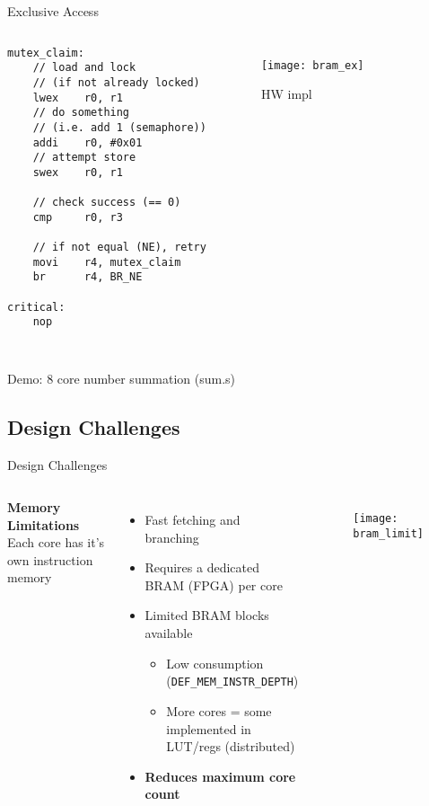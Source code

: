 \documentclass[aspectratio=169]{beamer}
\newcommand\pro{\item[$+$]}
\newcommand\con{\item[$-$]}
\begin{document}
\begin{frame}[fragile]{Exclusive Access}

\begin{columns}[t]
\begin{lstlisting}[basicstyle=\tiny\ttfamily]
mutex_claim:
    // load and lock
    // (if not already locked)
    lwex    r0, r1
    // do something
    // (i.e. add 1 (semaphore))
    addi    r0, #0x01
    // attempt store
    swex    r0, r1
    
    // check success (== 0)
    cmp     r0, r3
    
    // if not equal (NE), retry
    movi    r4, mutex_claim
    br      r4, BR_NE
    
critical:
    nop
    
\end{lstlisting}

\vspace{-1cm}
\begin{figure}
    \centering
    \texttt{[image: bram\_ex]}
    \caption{HW impl}
    \label{}
\end{figure}
\end{columns}
Demo: 8 core number summation (sum.s)
\end{frame}

\subsection{Design Challenges}
\begin{frame}[fragile,t]{Design Challenges}
\begin{columns}[t]
\textbf{Memory Limitations}\\
\vspace{0.5cm}
Each core has it's own instruction memory
\begin{itemize}
    \pro Fast fetching and branching
    \con Requires a dedicated BRAM (FPGA) per core
    \con Limited BRAM blocks available
    \begin{itemize}
        \con Low consumption (\verb|DEF_MEM_INSTR_DEPTH|)
        \con More cores = some implemented in LUT/regs (distributed)
    \end{itemize}
    \con \textbf{Reduces maximum core count}
\end{itemize}
\begin{figure}
    \centering
    \texttt{[image: bram\_limit]}
\end{figure}
\end{columns}
\end{frame}
\end{document}
